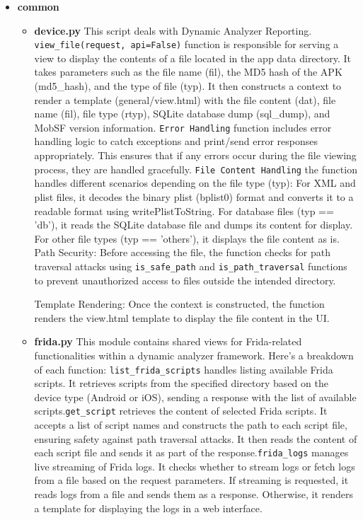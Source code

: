 \documentclass{report}
\begin{document}
\begin{itemize}
\begin{itemize}
    \end{itemize}
    \item\textbf{common}
    \begin{itemize}
        \item \textbf{device.py}
         This script deals with Dynamic Analyzer Reporting.
        \texttt{view\_file(request, api=False)} function is responsible for serving a view to display the contents of a file located in the app data directory. It takes parameters such as the file name (fil), the MD5 hash of the APK (md5\_hash), and the type of file (typ). It then constructs a context to render a template (general/view.html) with the file content (dat), file name (fil), file type (rtyp), SQLite database dump (sql\_dump), and MobSF version information. 
        \texttt{Error Handling} function includes error handling logic to catch exceptions and print/send error responses appropriately. This ensures that if any errors occur during the file viewing process, they are handled gracefully.  
        \texttt{File Content Handling} the function handles different scenarios  depending on the file type (typ): For XML and plist files, it decodes the binary plist (bplist0) format and converts it to a readable format using writePlistToString. For database files (typ == 'db'), it reads the SQLite database file and dumps its content for display. For other file types (typ == 'others'), it displays the file content as is.
        Path Security: Before accessing the file, the function checks for path traversal attacks using \texttt{is\_safe\_path} and \texttt{is\_path\_traversal} functions to prevent unauthorized access to files outside the intended directory.
        
        Template Rendering: Once the context is constructed, the function renders the view.html template to display the file content in the UI.

        \item \textbf{frida.py}
        This module contains shared views for Frida-related functionalities within a dynamic analyzer framework. Here's a breakdown of each function: \texttt{list\_frida\_scripts} handles listing available Frida scripts. It retrieves scripts from the specified directory based on the device type (Android or iOS), sending a response with the list of available scripts.\texttt{get\_script} retrieves the content of selected Frida scripts. It accepts a list of script names and constructs the path to each script file, ensuring safety against path traversal attacks. It then reads the content of each script file and sends it as part of the response.\texttt{frida\_logs} manages live streaming of Frida logs. It checks whether to stream logs or fetch logs from a file based on the request parameters. If streaming is requested, it reads logs from a file and sends them as a response. Otherwise, it renders a template for displaying the logs in a web interface.


\end{itemize}
\end{itemize}
\end{document}
